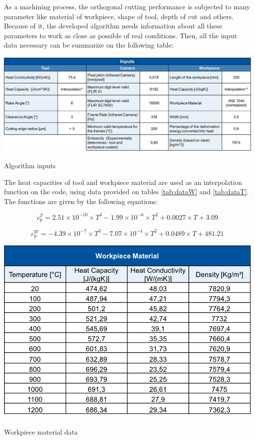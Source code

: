 	As a machining process, the orthogonal cutting performance is subjected to many parameter like material of workpiece, shape of tool, depth of cut and others. Because of it, the developed algorithm needs information about all these parameters to work as close as possible of real conditions. Then, all the input data necessary can be summarize on the following table:

	\begin{table}[H]
		\centering
		\captionsetup{justification=centering}
		\includegraphics[scale = 0.6]{Imagens/Inputs.png}
		\caption{Algorithm inputs \cite{augspurger2016experimental}}
		\label{tab:inputs}
	\end{table}

	The heat capacities of tool and workpiece material are used as an interpolation function on the code, using data provided on tables \ref{tab:dataW} and \ref{tab:dataT}. The functions are given by the following equations:

	\begin{equation} 
	\label{eq_heatCapTool}
		c_{p}^{T} = 2.51\times 10^{- 10}\times T^{3} - 1.99\times 10^{- 6} \times T^{2} + 0.0027 \times T + 3.09
	\end{equation}

	\begin{equation} 
	\label{eq_heatCapWork}
		c_{p}^{W} = -4.39\times 10^{- 7}\times T^{3} - 7.07\times 10^{- 4} \times T^{2} + 0.0489 \times T + 481.21
	\end{equation}

	\begin{table}[h]
		\centering
		\captionsetup{justification=centering}
		\includegraphics[scale = 0.6]{Imagens/dataWorkpiece.png}
		\caption{Workpiece material data \cite{augspurger2016experimental}}
		\label{tab:dataW}
	\end{table}

